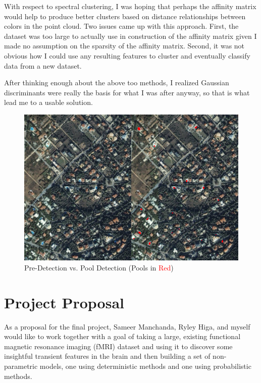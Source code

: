 \documentclass{article}[12pt]
\begin{document}
   With respect to spectral clustering, I was hoping that perhaps the affinity matrix would help to produce better clusters based on distance relationships between colors in the point cloud. Two issues came up with this approach. First, the dataset was too large to actually use in construction of the affinity matrix given I made no assumption on the sparsity of the affinity matrix. Second, it was not obvious how I could use any resulting features to cluster and eventually classify data from a new dataset. 
   
   After thinking enough about the above too methods, I realized Gaussian discriminants were really the basis for what I was after anyway, so that is what lead me to a usable solution.

   \begin{figure}[ht]
   \centerline{
   \includegraphics[scale=0.4]{img/p4_soln_compare.png}}
   \caption{Pre-Detection vs. Pool Detection (Pools in \textcolor{red}{Red})}
   \label{fig:pdetect}
   \end{figure}

\newpage
  \section{Project Proposal}
   As a proposal for the final project, Sameer Manchanda, Ryley Higa, and myself would like to work together with a goal of taking a large, existing functional magnetic resonance imaging (fMRI) dataset and using it to discover some insightful transient features in the brain and then building a set of non-parametric models, one using deterministic methods and one using probabilistic methods. 
   
\end{document}
